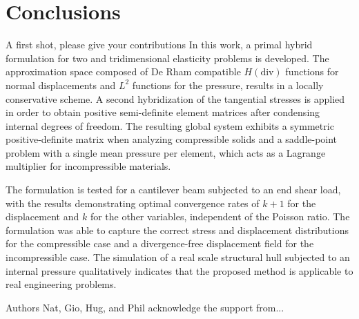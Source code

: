 \documentclass[english,11pt,3p,number,sort&compress]{elsarticle}
\newcommand{\giovane}{\color{red}{\bf\Large GA} \color{cyan} }
\begin{document}
\section{Conclusions}

{\giovane A first shot, please give your contributions}
In this work, a primal hybrid formulation for two and tridimensional elasticity problems is developed. The approximation space composed of De Rham compatible $H(\text{div})$ functions for normal displacements and $L^2$ functions for the pressure, results in a locally conservative scheme. A second hybridization of the tangential stresses is applied in order to obtain positive semi-definite element matrices after condensing internal degrees of freedom. The resulting global system exhibits a symmetric positive-definite matrix when analyzing compressible solids and a saddle-point problem with a single mean pressure per element, which acts as a Lagrange multiplier for incompressible materials.

The formulation is tested for a cantilever beam subjected to an end shear load, with the results demonstrating optimal convergence rates of $k+1$ for the displacement and $k$ for the other variables, independent of the Poisson ratio. The formulation was able to capture the correct stress and displacement distributions for the compressible case and a divergence-free displacement field for the incompressible case. The simulation of a real scale structural hull subjected to an internal pressure qualitatively indicates that the proposed method is applicable to real engineering problems.

\bigskip{} Authors  Nat, Gio, Hug, and Phil acknowledge the support from...

%


\end{document}

